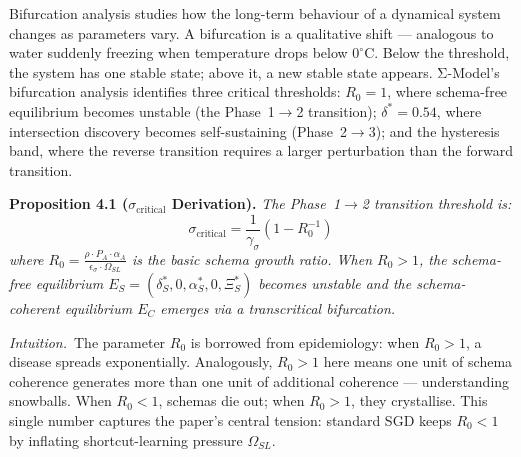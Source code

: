 \documentclass[10pt]{article}
\begin{document}
Bifurcation analysis \citep{kuznetsov1998} studies how the long-term behaviour of a dynamical system changes as parameters vary. A bifurcation is a qualitative shift --- analogous to water suddenly freezing when temperature drops below $0^\circ$C. Below the threshold, the system has one stable state; above it, a new stable state appears. Σ-Model's bifurcation analysis identifies three critical thresholds: $R_0 = 1$, where schema-free equilibrium becomes unstable (the Phase~1$\to$2 transition); $\delta^* = 0.54$, where intersection discovery becomes self-sustaining (Phase~2$\to$3); and the hysteresis band, where the reverse transition requires a larger perturbation than the forward transition.

\textbf{Proposition 4.1 ($\sigma_{\text{critical}}$ Derivation).} %
\textit{The Phase~1$\to$2 transition threshold is:
\begin{equation}\label{eq:sigma-critical-derived}
\sigma_{\text{critical}} = \frac{1}{\gamma_\sigma}(1 - R_0^{-1})
\end{equation}
where $R_0 = \frac{\rho \cdot P_A \cdot \alpha_A}{\epsilon_\sigma \cdot \Omega_{SL}}$ is the
basic schema growth ratio. When $R_0 > 1$, the schema-free
equilibrium $E_S = (\delta_S^*, 0, \alpha_S^*, 0, \Xi_S^*)$ becomes unstable
and the schema-coherent equilibrium $E_C$ emerges via a transcritical
bifurcation.}

\noindent\textit{Intuition.}\ The parameter $R_0$ is borrowed from
epidemiology: when $R_0 > 1$, a disease spreads exponentially.
Analogously, $R_0 > 1$ here means one unit of schema coherence generates
more than one unit of additional coherence --- understanding snowballs.
When $R_0 < 1$, schemas die out; when $R_0 > 1$, they crystallise.
This single number captures the paper's central tension: standard SGD
keeps $R_0 < 1$ by inflating shortcut-learning pressure $\Omega_{SL}$.
\end{document}
